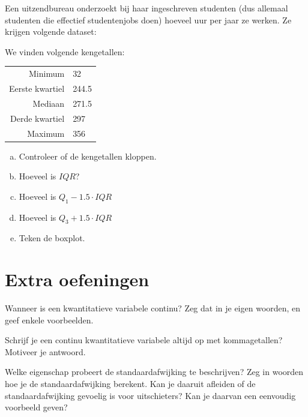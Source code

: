 \documentclass[12pt,twoside,a4paper]{article}
\begin{document}
\begin{oefening}
Een uitzendbureau onderzoekt bij haar ingeschreven studenten (dus allemaal studenten die effectief studentenjobs doen) hoeveel uur per jaar ze werken. Ze krijgen volgende dataset:

\begin{center}
\end{center}
We vinden volgende kengetallen:
\begin{center}
  \begin{tabular}{r|l}
    Minimum & 32\\
    Eerste kwartiel & 244.5\\
    Mediaan & 271.5\\
    Derde kwartiel & 297\\
    Maximum & 356
  \end{tabular}
\end{center}

\begin{enumerate}[(a)]
  \item Controleer of de kengetallen kloppen.
  \item Hoeveel is $IQR$?
  \item Hoeveel is $Q_1-1.5\cdot IQR$
  \item Hoeveel is $Q_3+1.5\cdot IQR$
  \item Teken de boxplot.
\end{enumerate}
\end{oefening}

\cleardoublepage
\section{Extra oefeningen}

\begin{oefening}
Wanneer is een kwantitatieve variabele continu? Zeg dat in je eigen woorden, en geef
enkele voorbeelden.
\end{oefening}

\begin{oefening}
Schrijf je een continu kwantitatieve variabele altijd op met kommagetallen? Motiveer je
antwoord.
\end{oefening}

\begin{oefening}
Welke eigenschap probeert de standaardafwijking te beschrijven? Zeg in woorden hoe je de
standaardafwijking berekent. Kan je daaruit afleiden of de standaardafwijking gevoelig is
voor uitschieters? Kan je daarvan een eenvoudig voorbeeld geven?
\end{oefening}
\end{document}
